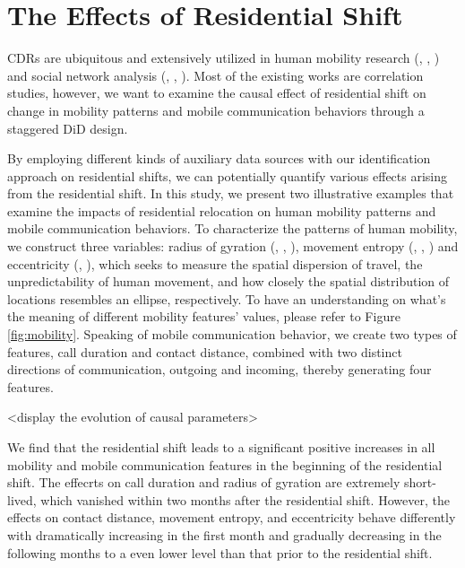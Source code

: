 \section{The Effects of Residential Shift}
CDRs are ubiquitous and extensively utilized in human mobility research (\cite{gonzalez2008understanding}, \cite{song2010limits}, \cite{wesolowski2016connecting}) and social network analysis (\cite{onnela2007structure}, \cite{cho2011friendship}, \cite{referral_effect_2023aer}). Most of the existing works are correlation studies, however, we want to examine the causal effect of residential shift on change in mobility patterns and mobile communication behaviors through a staggered DiD design.

By employing different kinds of auxiliary data sources with our identification approach on residential shifts, we can potentially quantify various effects arising from the residential shift. In this study, we present two illustrative examples that examine the impacts of residential relocation on human mobility patterns and mobile communication behaviors. To characterize the patterns of human mobility, we construct three variables: radius of gyration (\cite{gonzalez2008understanding}, \cite{ranjan2012call}, \cite{pappalardo2015returners}), movement entropy (\cite{eagle2010network}, \cite{song2010limits}, \cite{pappalardo2016analytical}) and eccentricity (\cite{yuan2012correlating}, \cite{zhao2019effect}), which seeks to measure the spatial dispersion of travel, the unpredictability of human movement, and how closely the spatial distribution of locations resembles an ellipse, respectively. To have an understanding on what's the meaning of different mobility features' values, please refer to Figure \ref{fig:mobility}. Speaking of mobile communication behavior, we create two types of features, call duration and contact distance, combined with two distinct directions of communication, outgoing and incoming, thereby generating four features.

<display the evolution of causal parameters>

We find that the residential shift leads to a significant positive increases in all mobility and mobile communication features in the beginning of the residential shift. The effecrts on call duration and radius of gyration are extremely short-lived, which vanished within two months after the residential shift. However, the effects on contact distance, movement entropy, and eccentricity behave differently with dramatically increasing in the first month and gradually decreasing in the following months to a even lower level than that prior to the residential shift.


